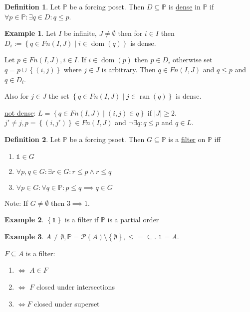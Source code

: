 \documentclass{scrartcl}
\renewcommand{\P}{\mathcal{P}}
\newcommand{\set}[1]{\left\{#1\right\}}
\DeclareMathOperator{\dom}{dom}
\DeclareMathOperator{\ran}{ran}
\theoremstyle{definition}
\newtheorem*{definition*}{Definition}
\newtheorem*{example*}{Example}
\theoremstyle{plain}
\theoremstyle{remark}
\begin{document}
	\begin{definition*}
		Let $\mathbb{P}$ be a forcing poset. Then $D \subseteq \mathbb{P}$ is \underline{dense} in $\mathbb{P}$ if $\forall p \in \mathbb{P}: \exists q \in D: q \leq p$.
	\end{definition*}

	\begin{example*}
		Let $I$ be infinite, $J \neq \emptyset$ then for $i \in I$ then $D_i := \set{q \in Fn(I,J) \mid i \in \dom(q)}$ is dense.
		
		Let $ p \in Fn(I, J), i \in I$. If $i \in \dom(p)$ then $p \in D_i$ otherwise set $q = p \cup \set{(i, j)}$ where $j \in J$ is arbitrary. Then $q \in Fn(I, J)$ and
		$q \leq p$ and $q \in D_i$.
		
		Also for $j \in J$ the set $\set{q \in Fn(I, J) \mid j \in \ran(q)}$ is dense.
		
		\underline{not dense}: $L = \set{q \in Fn(I, J) \mid (i, j) \in q}$ if $|J| \geq 2$. $j' \neq j, p = \set{(i, j')} \in Fn(I,J)$ and $\lnot \exists q: q \leq p$ and $q \in L$.
	\end{example*}

	\begin{definition*}
		Let $\mathbb{P}$ be a forcing psoet. Then $G \subseteq \mathbb{P}$ is a \underline{filter} on $\mathbb{P}$ iff 
		\begin{enumerate}[1.]
			\item $\mathbb{1} \in G$
			
			\item $\forall p, q \in G: \exists r \in G: r \leq p \land r \leq q$
			
			\item $\forall p \in G: \forall q \in \mathbb{P}: p \leq q \implies q \in G$ 
		\end{enumerate}
	
		Note: If $G \neq \emptyset$ then $3 \implies 1$.
	\end{definition*}

	\begin{example*}
		$\set{\mathbb{1}}$ is a filter if $\mathbb{P}$ is a partial order
	\end{example*}
	
	\begin{example*}
		$A \neq \emptyset, \mathbb{P} = \P(A) \setminus \set{\emptyset}, \leq = \subseteq$. $\mathbb{1} = A$.
		
		$F \subseteq A$ is a filter:
		\begin{enumerate}
			\item $\iff$ $A \in F$
			
			\item $\iff$ $F$ closed under intersections
			
			\item $\iff F$ closed under superset
		\end{enumerate}
	\end{example*}
\end{document}
